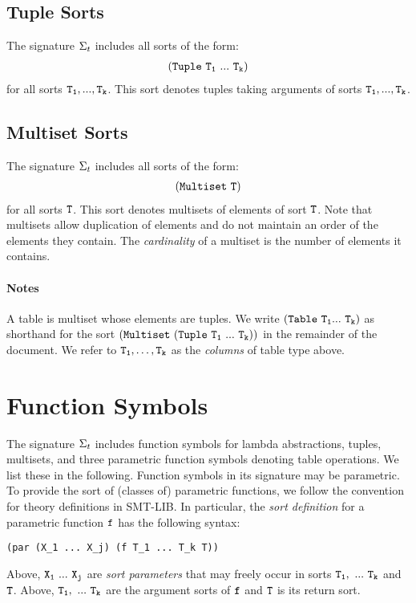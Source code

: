 \documentclass[english,a4paper,10pt]{article}
\begin{document}
\subsection{Tuple Sorts}

The signature $\Sigma_{t}$ includes all sorts of the form:
\begin{align*}
{\tt  (Tuple\ T_1\ ...\ T_k) }
\end{align*}
for all sorts ${\tt T_1, ..., T_k}$.
This sort denotes tuples taking arguments of sorts ${\tt T_1, ..., T_k}$.

\subsection{Multiset Sorts}
The signature $\Sigma_{t}$ includes all sorts of the form:
\begin{align*}
{\tt  (Multiset\ T) }
\end{align*}
for all sorts ${\tt T}$. 
This sort denotes multisets of elements of sort ${\tt T}$.
Note that multisets allow duplication of elements and do not maintain an order
of the elements they contain.
The \emph{cardinality} of a multiset is the number of elements it contains.

\paragraph{Notes}
A table is multiset whose elements are tuples.
We write ${\tt  (Table\ T_1 ...\ T_k)}$ as shorthand for 
the sort $\syntax{ (Multiset\ (Tuple\ T_1\ ...\ T_k)) }$ 
in the remainder of the document.
We refer to ${\tt T_1}, \ldots, {\tt T_k}$ as the \emph{columns} of table type above.

\section{Function Symbols}

The signature $\Sigma_{t}$ includes function symbols for
lambda abstractions,
tuples, multisets, and
three parametric function symbols denoting table operations.
We list these in the following.
Function symbols in its signature may be parametric.
To provide the sort of (classes of) parametric functions,
we follow the convention for theory definitions in SMT-LIB. %
In particular, the \emph{sort definition} for a parametric function ${\tt f}$
has the following syntax:
\begin{verbatim}
(par (X_1 ... X_j) (f T_1 ... T_k T))
\end{verbatim}
Above, ${\tt X_1\ ...\ X_j}$ are \emph{sort parameters}
that may freely occur in sorts ${\tt T_1,\ ...\ T_k}$ and ${\tt T}$.
Above, ${\tt T_1,\ ...\ T_k}$ are the argument sorts of ${\tt f}$
and ${\tt T}$ is its return sort.
\end{document}
